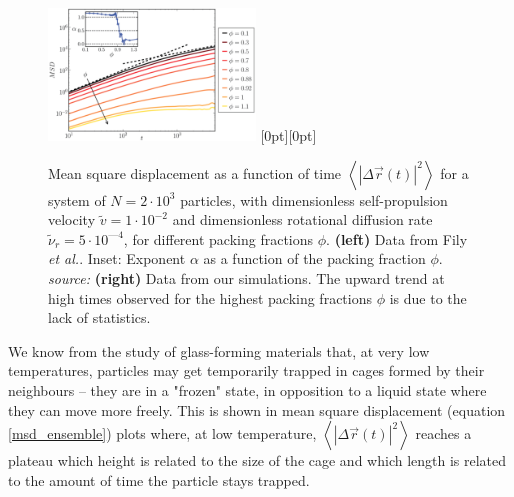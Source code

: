 \documentclass[class=report, float=false, crop=false]{standalone}
\begin{document}

\begin{figure}[h!]
\centering
\includegraphics[width=0.49\textwidth]{figures/images/msd_Vj1000_Rh5000_No2000.png}
\hfill
\raisebox{-2.5mm}[0pt][0pt]{}
\caption{Mean square displacement as a function of time $\left<|\Delta\vec{r}(t)|^2\right>$ for a system of $N=2\cdot10^3$ particles, with dimensionless self-propulsion velocity $\tilde{v} = 1\cdot10^{-2}$ and dimensionless rotational diffusion rate $\tilde{\nu}_r = 5\cdot10^{—4}$, for different packing fractions $\phi$. \textbf{(left)} Data from Fily \textit{et al.}. Inset: Exponent $\alpha$ as a function of the packing fraction $\phi$. \textit{source:} \cite{fily2014freezing} \textbf{(right)} Data from our simulations. The upward trend at high times observed for the highest packing fractions $\phi$ is due to the lack of statistics.}
\label{msd_phi}
\end{figure}

We know from the study of glass-forming materials \cite{binder2011glassy} that, at very low temperatures, particles may get temporarily trapped in cages formed by their neighbours -- they are in a "frozen" state, in opposition to a liquid state where they can move more freely. This is shown in mean square displacement (equation \ref{msd_ensemble}) plots where, at low temperature, $\left<|\Delta\vec{r}(t)|^2\right>$ reaches a plateau which height is related to the size of the cage and which length is related to the amount of time the particle stays trapped.\\
\end{document}
